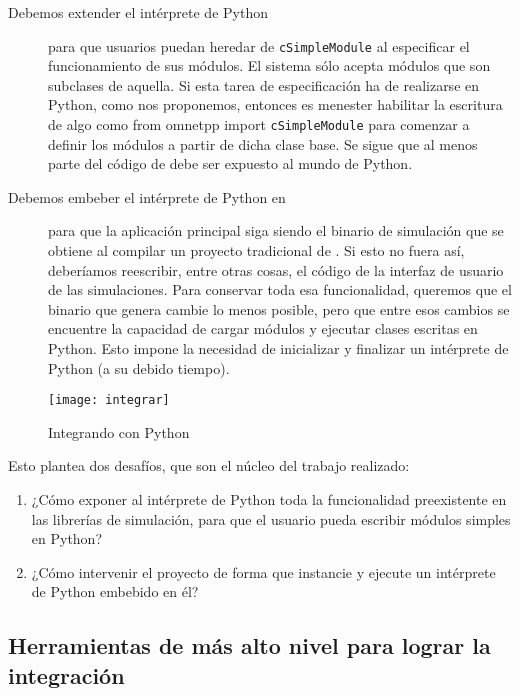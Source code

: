 \begin{description}
    \item[Debemos extender el intérprete de Python] para que usuarios puedan
    heredar de \verb!cSimpleModule! al especificar el funcionamiento de sus
    módulos. El sistema sólo acepta módulos que son subclases de aquella. Si
    esta tarea de especificación ha de realizarse en Python, como nos
    proponemos, entonces es menester habilitar la escritura de algo como from
    omnetpp import \verb!cSimpleModule! para comenzar a definir los módulos a
    partir de dicha clase base. Se sigue que al menos parte del código de
    \omnetpp{} debe ser expuesto al mundo de Python.

    \item[Debemos embeber el intérprete de Python en \omnetpp{}] para que la
    aplicación principal siga siendo el binario de simulación que se obtiene al
    compilar un proyecto tradicional de \omnetpp{}. Si esto no fuera así,
    deberíamos reescribir, entre otras cosas, el código de la interfaz de
    usuario de las simulaciones.  Para conservar toda esa funcionalidad,
    queremos que el binario que genera \omnetpp{} cambie lo menos posible, pero
    que entre esos cambios se encuentre la capacidad de cargar módulos y
    ejecutar clases escritas en Python. Esto impone la necesidad de inicializar
    y finalizar un intérprete de Python (a su debido tiempo).
\end{description}

\begin{figure}[h]
\caption{Integrando \omnetpp{} con Python}
\label{fig:integrar}
\centering
\texttt{[image: integrar]}
\end{figure}

Esto plantea dos desafíos, que son el núcleo del trabajo realizado:

\begin{enumerate}
    \item ¿Cómo exponer al intérprete de Python toda la funcionalidad
    preexistente en las librerías de simulación, para que el usuario pueda
    escribir módulos simples en Python?

    \item ¿Cómo intervenir el proyecto \omnetpp{} de forma que instancie y
    ejecute un intérprete de Python embebido en él?
\end{enumerate}

\subsection{Herramientas de más alto nivel para lograr la integración}


